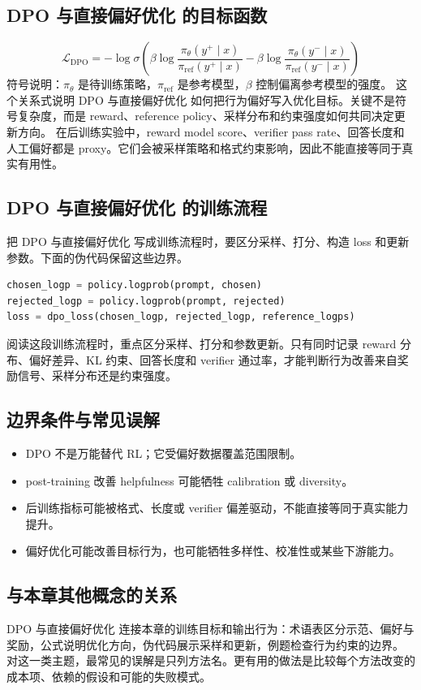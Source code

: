 \documentclass[a4paper]{article}
\begin{document}
\subsection{DPO 与直接偏好优化 的目标函数}
\[\mathcal{L}_{\text{DPO}}=-\log\sigma\left(\beta\log\frac{\pi_\theta(y^+\mid x)}{\pi_{\text{ref}}(y^+\mid x)}-\beta\log\frac{\pi_\theta(y^-\mid x)}{\pi_{\text{ref}}(y^-\mid x)}\right)\]
符号说明：\(\pi_\theta\) 是待训练策略，\(\pi_{\text{ref}}\) 是参考模型，\(\beta\) 控制偏离参考模型的强度。
这个关系式说明 DPO 与直接偏好优化 如何把行为偏好写入优化目标。关键不是符号复杂度，而是 reward、reference policy、采样分布和约束强度如何共同决定更新方向。
在后训练实验中，reward model score、verifier pass rate、回答长度和人工偏好都是 proxy。它们会被采样策略和格式约束影响，因此不能直接等同于真实有用性。
\subsection{DPO 与直接偏好优化 的训练流程}
把 DPO 与直接偏好优化 写成训练流程时，要区分采样、打分、构造 loss 和更新参数。下面的伪代码保留这些边界。
\begin{lstlisting}[language=Python]
chosen_logp = policy.logprob(prompt, chosen)
rejected_logp = policy.logprob(prompt, rejected)
loss = dpo_loss(chosen_logp, rejected_logp, reference_logps)
\end{lstlisting}
阅读这段训练流程时，重点区分采样、打分和参数更新。只有同时记录 reward 分布、偏好差异、KL 约束、回答长度和 verifier 通过率，才能判断行为改善来自奖励信号、采样分布还是约束强度。
\subsection{边界条件与常见误解}
\begin{itemize}
\item DPO 不是万能替代 RL；它受偏好数据覆盖范围限制。
\item post-training 改善 helpfulness 可能牺牲 calibration 或 diversity。
\item 后训练指标可能被格式、长度或 verifier 偏差驱动，不能直接等同于真实能力提升。
\item 偏好优化可能改善目标行为，也可能牺牲多样性、校准性或某些下游能力。
\end{itemize}
\subsection{与本章其他概念的关系}
DPO 与直接偏好优化 连接本章的训练目标和输出行为：术语表区分示范、偏好与奖励，公式说明优化方向，伪代码展示采样和更新，例题检查行为约束的边界。
对这一类主题，最常见的误解是只列方法名。更有用的做法是比较每个方法改变的成本项、依赖的假设和可能的失败模式。
\end{document}
